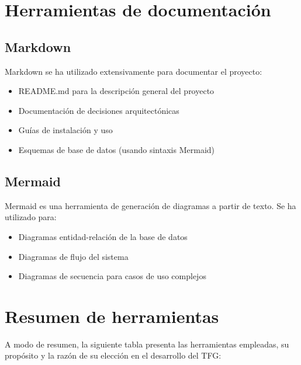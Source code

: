\section{Herramientas de documentación}\label{sec:herramientas-doc}

\subsection{Markdown}

Markdown se ha utilizado extensivamente para documentar el proyecto:

\begin{itemize}
    \item README.md para la descripción general del proyecto
    \item Documentación de decisiones arquitectónicas
    \item Guías de instalación y uso
    \item Esquemas de base de datos (usando sintaxis Mermaid)
\end{itemize}

\subsection{Mermaid}

Mermaid es una herramienta de generación de diagramas a partir de texto. Se ha utilizado para:

\begin{itemize}
    \item Diagramas entidad-relación de la base de datos
    \item Diagramas de flujo del sistema
    \item Diagramas de secuencia para casos de uso complejos
\end{itemize}

\section{Resumen de herramientas}

A modo de resumen, la siguiente tabla presenta las herramientas empleadas, su propósito y la razón de su elección en el desarrollo del TFG:

